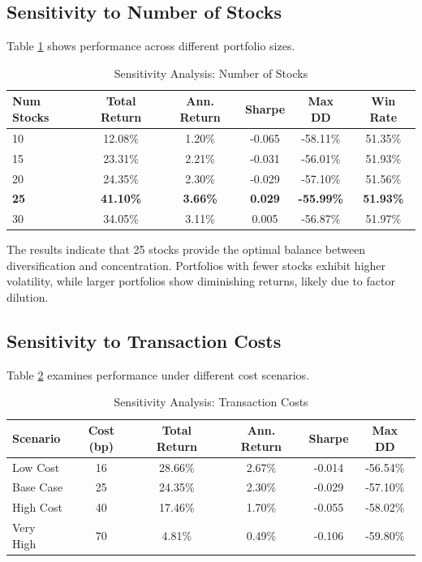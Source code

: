 \documentclass[12pt,a4paper]{article}
\begin{document}
\subsection{Sensitivity to Number of Stocks}

Table \ref{tab:sensitivity_num_stocks} shows performance across different portfolio sizes.

\begin{table}[H]
\centering
\small
\caption{Sensitivity Analysis: Number of Stocks}
\label{tab:sensitivity_num_stocks}
\begin{tabular}{@{}lccccc@{}}
\toprule
\textbf{Num Stocks} & \textbf{Total Return} & \textbf{Ann. Return} & \textbf{Sharpe} & \textbf{Max DD} & \textbf{Win Rate} \\
\midrule
10 & 12.08\% & 1.20\% & -0.065 & -58.11\% & 51.35\% \\
15 & 23.31\% & 2.21\% & -0.031 & -56.01\% & 51.93\% \\
20 & 24.35\% & 2.30\% & -0.029 & -57.10\% & 51.56\% \\
\textbf{25} & \textbf{41.10\%} & \textbf{3.66\%} & \textbf{0.029} & \textbf{-55.99\%} & \textbf{51.93\%} \\
30 & 34.05\% & 3.11\% & 0.005 & -56.87\% & 51.97\% \\
\bottomrule
\end{tabular}
\end{table}

The results indicate that 25 stocks provide the optimal balance between diversification and concentration. Portfolios with fewer stocks exhibit higher volatility, while larger portfolios show diminishing returns, likely due to factor dilution.

\subsection{Sensitivity to Transaction Costs}

Table \ref{tab:sensitivity_costs} examines performance under different cost scenarios.

\begin{table}[H]
\centering
\small
\caption{Sensitivity Analysis: Transaction Costs}
\label{tab:sensitivity_costs}
\begin{tabular}{@{}lccccc@{}}
\toprule
\textbf{Scenario} & \textbf{Cost (bp)} & \textbf{Total Return} & \textbf{Ann. Return} & \textbf{Sharpe} & \textbf{Max DD} \\
\midrule
Low Cost & 16 & 28.66\% & 2.67\% & -0.014 & -56.54\% \\
Base Case & 25 & 24.35\% & 2.30\% & -0.029 & -57.10\% \\
High Cost & 40 & 17.46\% & 1.70\% & -0.055 & -58.02\% \\
Very High & 70 & 4.81\% & 0.49\% & -0.106 & -59.80\% \\
\bottomrule
\end{tabular}
\end{table}
\end{document}
